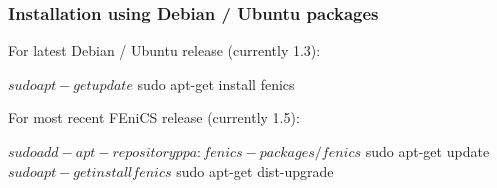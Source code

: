 \begin{frame}[fragile]
  \frametitle{Installation using Debian / Ubuntu packages}

For latest Debian / Ubuntu release (currently 1.3):
  \begin{bash}
$ sudo apt-get update
$ sudo apt-get install fenics
  \end{bash}

\bigskip

For most recent FEniCS release (currently 1.5):
  \begin{bash}
$ sudo add-apt-repository ppa:fenics-packages/fenics
$ sudo apt-get update
$ sudo apt-get install fenics
$ sudo apt-get dist-upgrade
  \end{bash}

\end{frame}
